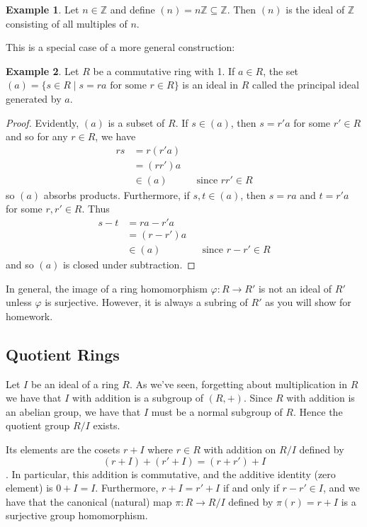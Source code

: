\documentclass[12pt,letterpaper,DIV=11,final]{scrartcl}
\theoremstyle{plain}
\theoremstyle{definition}
\newtheorem{example}{Example}[section]
\theoremstyle{remark}
\begin{document}
\begin{example}
  Let $n \in \mathbb{Z}$ and define $(n) = n \mathbb{Z} \subseteq \mathbb{Z}$.
  Then $(n)$ is the ideal of $\mathbb{Z}$ consisting of all multiples of $n$.
\end{example}
This is a special case of a more general construction:

\begin{example}
  Let $R$ be a commutative ring with 1.
  If $a \in R$, the set $(a) = \{ s \in R \mid s = ra \text{ for some } r \in R \}$ is an ideal in $R$ called the principal ideal generated by $a$.

  \begin{proof}
    Evidently, $(a)$ is a subset of $R$.
    If $s \in (a)$, then $s = r' a$ for some $r' \in R$ and so for any $r \in R$, we have
    \begin{align*}
      rs &= r (r' a) \\
         &= (r r') a \\
         &\in (a) && \text{since $rr' \in R$}
    \end{align*}
    so $(a)$ absorbs products.
    Furthermore, if $s, t \in (a)$, then $s = ra$ and $t = r' a$ for some $r, r' \in R$.
    Thus
    \begin{align*}
      s - t &= ra - r' a \\
            &= (r - r') a \\
            &\in (a) && \text{since $r - r' \in R$}
    \end{align*}
    and so $(a)$ is closed under subtraction.
  \end{proof}
\end{example}

In general, the image of a ring homomorphism $\varphi : R \to R'$ is not an ideal of $R'$ unless $\varphi$ is surjective.
However, it is always a subring of $R'$ as you will show for homework.

\subsection{Quotient Rings}

Let $I$ be an ideal of a ring $R$.
As we've seen, forgetting about multiplication in $R$ we have that $I$ with addition is a subgroup of $(R, +)$.
Since $R$ with addition is an abelian group, we have that $I$ must be a normal subgroup of $R$.
Hence the quotient group $R/I$ exists.

Its elements are the cosets $r + I$ where $r \in R$ with addition on $R/I$ defined by
\begin{displaymath}
  (r + I) + (r' + I) = (r + r') + I
\end{displaymath}.
In particular, this addition is commutative, and the additive identity (zero element) is $0 + I = I$.
Furthermore, $r + I = r' + I$ if and only if $r - r' \in I$, and we have that the canonical (natural) map $\pi : R \to R/I$ defined by $\pi(r) = r + I$ is a surjective group homomorphism.
\end{document}
